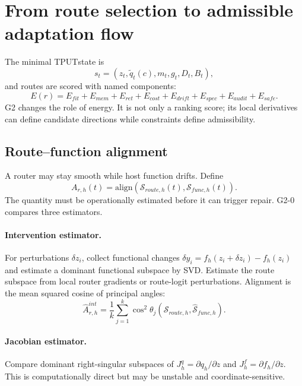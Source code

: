 \documentclass[11pt,a4paper]{article}
\newcommand{\TPUT}{\textsc{TPUT}}
\begin{document}
\section{From route selection to admissible adaptation flow}
The minimal \TPUT state is \cite{mmalstput}
\begin{equation}
s_t=(z_t,\tilde q_t(c),m_t,g_t,D_t,B_t),
\end{equation}
and routes are scored with named components:
\begin{equation}
E(r)=E_{fit}+E_{mem}+E_{ret}+E_{cost}+E_{drift}+E_{spec}+E_{audit}+E_{safe}.
\end{equation}
G2 changes the role of energy. It is not only a ranking score; its local derivatives can define candidate directions while constraints define admissibility.

\subsection{Route--function alignment}
A router may stay smooth while host function drifts. Define
\begin{equation}
A_{r,h}(t)=\mathrm{align}\left(\mathcal{S}_{route,h}(t),\mathcal{S}_{func,h}(t)\right).
\end{equation}
The quantity must be operationally estimated before it can trigger repair. G2-0 compares three estimators.

\paragraph{Intervention estimator.} For perturbations $\delta z_i$, collect functional changes $\delta y_i=f_h(z_i+\delta z_i)-f_h(z_i)$ and estimate a dominant functional subspace by SVD. Estimate the route subspace from local router gradients or route-logit perturbations. Alignment is the mean squared cosine of principal angles:
\begin{equation}
\widehat A^{int}_{r,h}=\frac{1}{k}\sum_{j=1}^{k}\cos^2\theta_j\left(\widehat{\mathcal S}_{route,h},\widehat{\mathcal S}_{func,h}\right).
\end{equation}

\paragraph{Jacobian estimator.} Compare dominant right-singular subspaces of $J_h^q=\partial q_h/\partial z$ and $J_h^f=\partial f_h/\partial z$. This is computationally direct but may be unstable and coordinate-sensitive.
\end{document}
